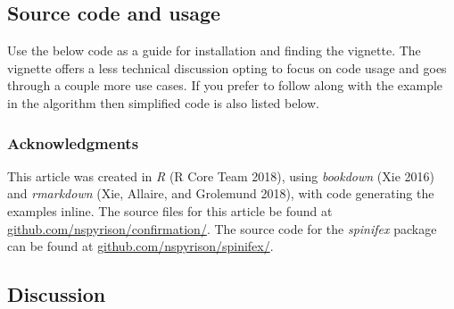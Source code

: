 \hypertarget{sec:usage}{%
\subsection{Source code and usage}\label{sec:usage}}

Use the below code as a guide for installation and finding the vignette. The vignette offers a less technical discussion opting to focus on code usage and goes through a couple more use cases. If you prefer to follow along with the example in the algorithm then simplified code is also listed below.

\begin{Schunk}
\end{Schunk}

\hypertarget{acknowledgments}{%
\subsubsection{Acknowledgments}\label{acknowledgments}}

This article was created in \emph{R} (R Core Team 2018), using \emph{bookdown} (Xie 2016) and \emph{rmarkdown} (Xie, Allaire, and Grolemund 2018), with code generating the examples inline. The source files for this article be found at \href{https://github.com/nspyrison/confirmation/}{github.com/nspyrison/confirmation/}. The source code for the \emph{spinifex} package can be found at \href{https://github.com/nspyrison/spinifex/}{github.com/nspyrison/spinifex/}.

\hypertarget{sec:discussion}{%
\subsection{Discussion}\label{sec:discussion}}

